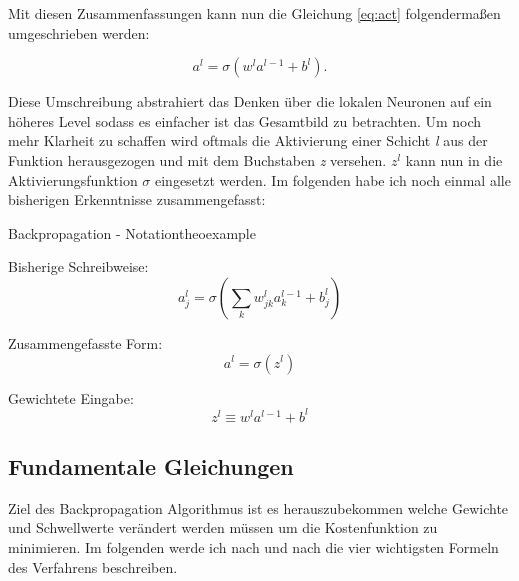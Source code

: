 Mit diesen Zusammenfassungen kann nun die Gleichung \ref{eq:act} folgendermaßen umgeschrieben werden: 

\begin{equation}
  a^{l} = \sigma(w^l a^{l-1}+b^l).
\end{equation}

Diese Umschreibung abstrahiert das Denken über die lokalen Neuronen auf ein höheres Level sodass es einfacher ist das Gesamtbild zu betrachten. Um noch mehr Klarheit zu schaffen wird oftmals die Aktivierung einer Schicht \emph{l} aus der Funktion herausgezogen und mit dem Buchstaben \emph{z} versehen. $z^l$ kann nun in die Aktivierungsfunktion $\sigma$ eingesetzt werden. Im folgenden habe ich noch einmal alle bisherigen Erkenntnisse zusammengefasst: 

\begin{mytheo}{Backpropagation - Notation}{theoexample}

Bisherige Schreibweise:
\begin{equation}
  a^{l}_j = \sigma\left( \sum_k w^{l}_{jk} a^{l-1}_k + b^l_j \right) \nonumber
\end{equation}

Zusammengefasste Form:
\begin{equation} \label{eq:zusForm}
a^l = \sigma(z^l)
\end{equation}

Gewichtete Eingabe:
\begin{equation} \label{eq:gewEin}
  z^l \equiv w^l a^{l-1}+b^l
\end{equation}

\end{mytheo}

\subsection{Fundamentale Gleichungen}

Ziel des Backpropagation Algorithmus ist es herauszubekommen welche Gewichte und Schwellwerte verändert werden müssen um die Kostenfunktion zu minimieren. Im folgenden werde ich nach und nach die vier wichtigsten Formeln des Verfahrens beschreiben. 

